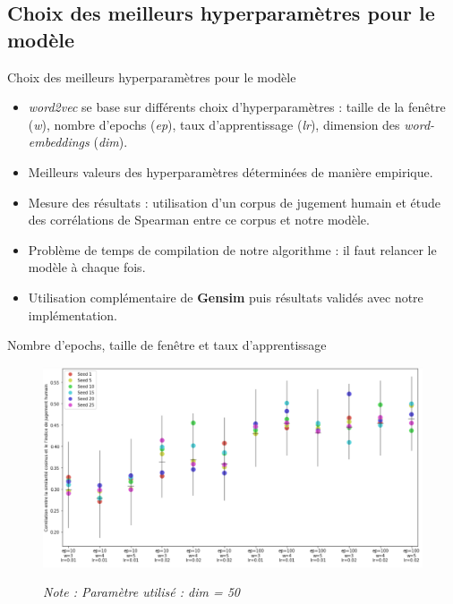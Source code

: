 \documentclass[10pt,xcolor=table,color={dvipsnames,usenames},ignorenonframetext,usepdftitle=false,french]{beamer}
\begin{document}
\subsection{Choix des meilleurs hyperparamètres pour le
modèle}\label{choix-des-meilleurs-hyperparamuxe8tres-pour-le-moduxe8le}

\begin{frame}{Choix des meilleurs hyperparamètres pour le modèle}

\begin{itemize}
\item
  \textit{word2vec} se base sur différents choix d'hyperparamètres :
  taille de la fenêtre (\textit{w}), nombre d'epochs (\textit{ep}), taux
  d'apprentissage (\textit{lr}), dimension des \textit{word-embeddings}
  (\textit{dim}).
\item
  Meilleurs valeurs des hyperparamètres déterminées de manière
  empirique.
\item
  Mesure des résultats : utilisation d'un corpus de jugement humain et
  étude des corrélations de Spearman entre ce corpus et notre modèle.
\item
  Problème de temps de compilation de notre algorithme : il faut
  relancer le modèle à chaque fois.
\item
  Utilisation complémentaire de \textbf{Gensim} puis résultats validés
  avec notre implémentation.
\end{itemize}

\end{frame}

\begin{frame}{Nombre d'epochs, taille de fenêtre et taux
d'apprentissage}

\begin{figure}[htp]
\begin{center}
\includegraphics[width=1\textwidth]{img/test_parametres.png}
\end{center}
\vspace{-0.3cm}
\footnotesize
\emph{Note : Paramètre utilisé : dim = 50}
\end{figure}

\end{frame}
\end{document}
